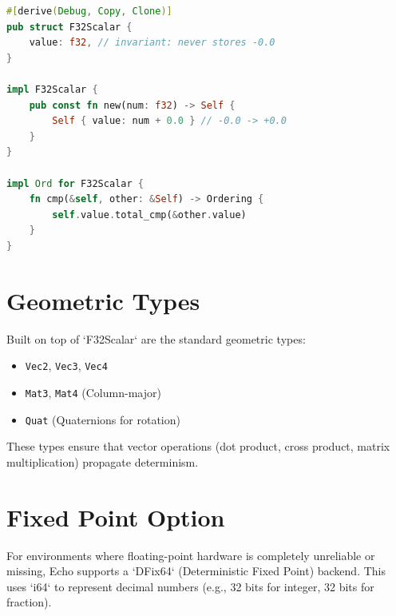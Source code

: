 \begin{lstlisting}[language=Rust, caption=F32Scalar canonicalizes -0.0 and derives ordering, label=lst:f32scalar]
#[derive(Debug, Copy, Clone)]
pub struct F32Scalar {
    value: f32, // invariant: never stores -0.0
}

impl F32Scalar {
    pub const fn new(num: f32) -> Self {
        Self { value: num + 0.0 } // -0.0 -> +0.0
    }
}

impl Ord for F32Scalar {
    fn cmp(&self, other: &Self) -> Ordering {
        self.value.total_cmp(&other.value)
    }
}
\end{lstlisting}

\section{Geometric Types}

Built on top of `F32Scalar` are the standard geometric types:
\begin{itemize}
    \item \texttt{Vec2}, \texttt{Vec3}, \texttt{Vec4}
    \item \texttt{Mat3}, \texttt{Mat4} (Column-major)
    \item \texttt{Quat} (Quaternions for rotation)
\end{itemize}

These types ensure that vector operations (dot product, cross product, matrix multiplication) propagate determinism.

\section{Fixed Point Option}
For environments where floating-point hardware is completely unreliable or missing, Echo supports a `DFix64` (Deterministic Fixed Point) backend. This uses `i64` to represent decimal numbers (e.g., 32 bits for integer, 32 bits for fraction).
